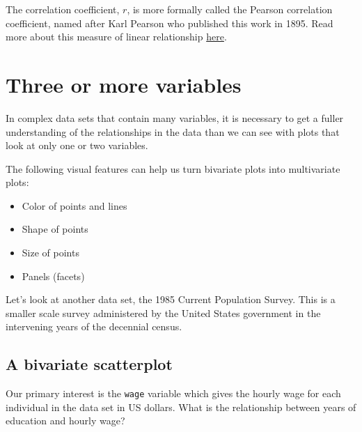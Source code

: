 \documentclass[
]{book}
\newenvironment{Shaded}{\begin{snugshade}}{\end{snugshade}}
\newcommand{\CommentTok}[1]{\textcolor[rgb]{0.56,0.35,0.01}{\textit{#1}}}
\newcommand{\DataTypeTok}[1]{\textcolor[rgb]{0.13,0.29,0.53}{#1}}
\newcommand{\KeywordTok}[1]{\textcolor[rgb]{0.13,0.29,0.53}{\textbf{#1}}}
\newcommand{\NormalTok}[1]{#1}
\newcommand{\OperatorTok}[1]{\textcolor[rgb]{0.81,0.36,0.00}{\textbf{#1}}}
\newcommand{\StringTok}[1]{\textcolor[rgb]{0.31,0.60,0.02}{#1}}
\providecommand{\tightlist}{%
  \setlength{\itemsep}{0pt}\setlength{\parskip}{0pt}}
\begin{document}
The correlation coefficient, \(r\), is more formally called the Pearson correlation coefficient, named after Karl Pearson who published this work in 1895. Read more about this measure of linear relationship \href{https://en.wikipedia.org/wiki/Pearson_correlation_coefficient}{here}.

\hypertarget{three-or-more-variables}{%
\section{Three or more variables}\label{three-or-more-variables}}

In complex data sets that contain many variables, it is necessary to get a fuller understanding of the relationships in the data than we can see with plots that look at only one or two variables.

The following visual features can help us turn bivariate plots into multivariate plots:

\begin{itemize}
\tightlist
\item
  Color of points and lines
\item
  Shape of points
\item
  Size of points
\item
  Panels (facets)
\end{itemize}

Let's look at another data set, the 1985 Current Population Survey. This is a smaller scale survey administered by the United States government in the intervening years of the decennial census.

\hypertarget{a-bivariate-scatterplot}{%
\subsection{A bivariate scatterplot}\label{a-bivariate-scatterplot}}

Our primary interest is the \texttt{wage} variable which gives the hourly wage for each individual in the data set in US dollars. What is the relationship between years of education and hourly wage?

\begin{Shaded}
\end{Shaded}
\end{document}
